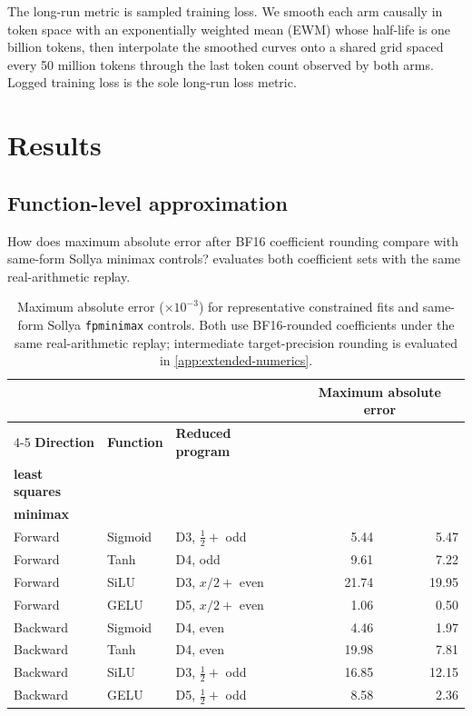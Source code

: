 \documentclass[11pt]{article}
\newcommand{\reporttablefont}{\small}
\begin{document}
The long-run metric is sampled training loss. We smooth each arm causally in
token space with an exponentially weighted mean (EWM) whose half-life is one
billion tokens, then interpolate the smoothed curves onto a shared grid spaced
every 50 million tokens through the last token count observed by both arms.
Logged training loss is the sole long-run loss metric.

\section{Results}

\subsection{Function-level approximation}

How does maximum absolute error after BF16 coefficient rounding compare with
same-form Sollya minimax controls?  evaluates both
coefficient sets with the same real-arithmetic replay.

\begin{table}[H]
\centering
\reporttablefont
\caption{Maximum absolute error ($\times10^{-3}$) for representative
constrained fits and same-form Sollya \texttt{fpminimax} controls. Both use
BF16-rounded coefficients under the same real-arithmetic replay; intermediate
target-precision rounding is evaluated in
\cref{app:extended-numerics}.}
\label{tab:function-summary}
\begin{tabularx}{\textwidth}{@{}llXrr@{}}
\toprule
& & & \multicolumn{2}{c}{\textbf{Maximum absolute error}} \\
\cmidrule(lr){4-5}
\textbf{Direction} & \textbf{Function} & \textbf{Reduced program} &
\shortstack{\textbf{Endpoint-constrained}\\\textbf{least squares}} &
\shortstack{\textbf{Sollya}\\\textbf{minimax}} \\
\midrule
Forward & Sigmoid & D3, $\tfrac12+$ odd & 5.44 & 5.47 \\
Forward & Tanh    & D4, odd & 9.61 & 7.22 \\
Forward & SiLU    & D3, $x/2+$ even & 21.74 & 19.95 \\
Forward & GELU    & D5, $x/2+$ even & 1.06 & 0.50 \\
\midrule
Backward & Sigmoid & D4, even & 4.46 & 1.97 \\
Backward & Tanh    & D4, even & 19.98 & 7.81 \\
Backward & SiLU    & D3, $\tfrac12+$ odd & 16.85 & 12.15 \\
Backward & GELU    & D5, $\tfrac12+$ odd & 8.58 & 2.36 \\
\bottomrule
\end{tabularx}
\end{table}
\end{document}
